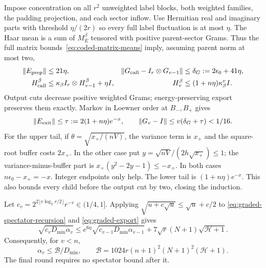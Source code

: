 Impose concentration on all $r^2$ unweighted label blocks, both weighted
families, the padding projection, and each sector inflow. Use Hermitian
real and imaginary parts with threshold $\eta/(2r)$ so every full label
fluctuation is at most $\eta$. The Haar mean is a sum of
$M_E^\beta$ tensored with positive parent-sector Grams.
Thus the full matrix bounds~\eqref{eq:coded-matrix-means} imply,
assuming parent norm at most two,
\begin{align*}
 \|E_{\rm prep}\|&\leq21\eta,
 &\|G_{\rm call}-I_r\otimes G_{v-1}\|&\leq\delta_G:=2\epsilon_0+41\eta,\\
 H_{\rm call}^{\beta}&\leq\kappa_\beta I_r\otimes H_{v-1}^{\beta}+\eta I,
 &H_v^\beta&\leq(1+n\eta)\kappa_\beta^vI.
\end{align*}
Output cuts decrease positive weighted Grams; energy-preserving export
preserves them exactly. Markov in Loewner order at $B_-,B_+$ gives
\begin{equation}\label{eq:graded-exit}
 \|E_{\rm exit}\|\leq\tau:=2(1+n\eta)e^{-x},\qquad
 \|G_v-I\|\leq v(\delta_G+\tau)<1/16.
\end{equation}
For the upper tail, if $\theta=\sqrt{x_+/(nV)}$, the variance term is
$x_+$ and the square-root buffer costs $2x_+$. In the other case put
$y=\sqrt{nV}/(2h\sqrt{x_+})\leq1$; the variance-minus-buffer part is
$x_+(y^2-2y-1)\leq-x_+$. In both cases
$n\epsilon_0-x_+=-x$. Integer endpoints only help. The lower tail is
$(1+n\eta)e^{-x}$. This also bounds every child before the output cut
by two, closing the induction.

Let $c_v=2^{2\lfloor v\log_2r/2\rfloor}r^{-v}\in(1/4,1]$.
Applying $\sqrt{u+c\sqrt u}\leq\sqrt u+c/2$ to
\eqref{eq:graded-spectator-recursion} and \eqref{eq:graded-export} gives
\[
 \sqrt{c_vD_{\min}\alpha_v}\leq
 e^{6\eta}\sqrt{c_{v-1}D_{\min}\alpha_{v-1}}
 +7\sqrt r(N+1)\sqrt{\mathcal H+1}.
\]
Consequently, for $v<n$,
\[
 \alpha_v\leq\mathcal B/D_{\min},\qquad
 \mathcal B=1024r(n+1)^2(N+1)^2(\mathcal H+1).
\]
The final round requires no spectator bound after it.

